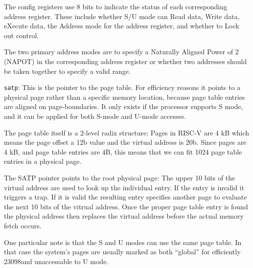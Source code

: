 The config registers use 8 bits to indicate the status of each
corresponding address register.  These include whether S/U mode can
Read data, Write data, eXecute data, the Address mode for the address
register, and whether to Lock out control.

The two primary address modes are to specify a Naturally Aligned Power
of 2 (NAPOT) in the corresponding address register or whether two
addresses should be taken together to specify a valid range.

{\tt satp}: This is the pointer to the page table.  For efficiency
reasons it points to a physical page rather than a specific memory
location, because page table entries are aligned on page-boundaries.
It only exists if the processor supports S mode, and it can be applied
for both S-mode and U-mode accesses.

The page table itself is a 2-level radix structure: Pages in RISC-V
are 4 kB which means the page offset a 12b value and the virtual
address is 20b.  Since pages are 4 kB, and page table entries are 4B,
this means that we can fit 1024 page table entries in a physical page.

The SATP pointer points to the root physical page: The upper 10 bits
of the virtual address are used to look up the individual entry.  If
the entry is invalid it triggers a trap.  If it is valid the resulting
entry specifies another page to evaluate the next 10 bits of the
vitrual address.  Once the proper page table entry is found the
physical address then replaces the virtual address before the actual
memory fetch occurs.

One particular note is that the S and U modes can use the same page
table.  In that case the system's pages are usually marked as both
``global'' for efficiently 23098and unaccessable to U mode.

